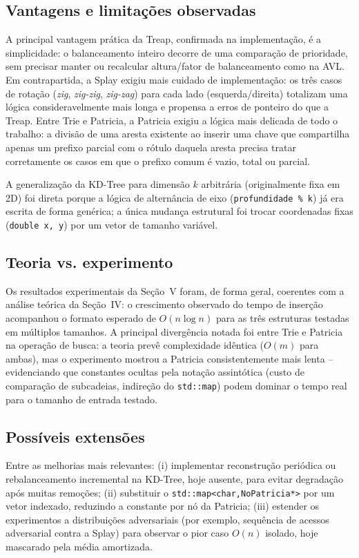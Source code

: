 \documentclass[conference]{IEEEtran}
\begin{document}
\subsection{Vantagens e limitações observadas}
A principal vantagem prática da Treap, confirmada na implementação, é a simplicidade: o balanceamento inteiro decorre de uma comparação de prioridade, sem precisar manter ou recalcular altura/fator de balanceamento como na AVL. Em contrapartida, a Splay exigiu mais cuidado de implementação: os três casos de rotação (\textit{zig}, \textit{zig-zig}, \textit{zig-zag}) para cada lado (esquerda/direita) totalizam uma lógica consideravelmente mais longa e propensa a erros de ponteiro do que a Treap. Entre Trie e Patricia, a Patricia exigiu a lógica mais delicada de todo o trabalho: a divisão de uma aresta existente ao inserir uma chave que compartilha apenas um prefixo parcial com o rótulo daquela aresta precisa tratar corretamente os casos em que o prefixo comum é vazio, total ou parcial.

A generalização da KD-Tree para dimensão $k$ arbitrária (originalmente fixa em 2D) foi direta porque a lógica de alternância de eixo (\texttt{profundidade \% k}) já era escrita de forma genérica; a única mudança estrutural foi trocar coordenadas fixas (\texttt{double x, y}) por um vetor de tamanho variável.

\subsection{Teoria vs. experimento}
Os resultados experimentais da Seção~V foram, de forma geral, coerentes com a análise teórica da Seção~IV: o crescimento observado do tempo de inserção acompanhou o formato esperado de $O(n\log n)$ para as três estruturas testadas em múltiplos tamanhos. A principal divergência notada foi entre Trie e Patricia na operação de busca: a teoria prevê complexidade idêntica ($O(m)$ para ambas), mas o experimento mostrou a Patricia consistentemente mais lenta -- evidenciando que constantes ocultas pela notação assintótica (custo de comparação de subcadeias, indireção do \texttt{std::map}) podem dominar o tempo real para o tamanho de entrada testado.

\subsection{Possíveis extensões}
Entre as melhorias mais relevantes: (i) implementar reconstrução periódica ou rebalanceamento incremental na KD-Tree, hoje ausente, para evitar degradação após muitas remoções; (ii) substituir o \texttt{std::map<char,NoPatricia*>} por um vetor indexado, reduzindo a constante por nó da Patricia; (iii) estender os experimentos a distribuições adversariais (por exemplo, sequência de acessos adversarial contra a Splay) para observar o pior caso $O(n)$ isolado, hoje mascarado pela média amortizada.
\end{document}
